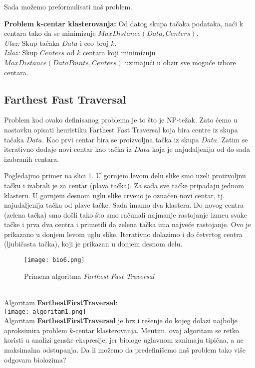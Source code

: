 Sada možemo preformulisati naš problem.

\begin{tcolorbox}
\textbf{Problem k-centar klasterovanja:} Od datog skupa tačaka podataka, naći k centara tako da se minimizuje $MaxDistance(Data, Centers)$.\\
\textit{Ulaz:} Skup tačaka $Data$ i ceo broj $k$.\\
\textit{Izlaz:} Skup $Centers$ od $k$ centara koji minimizuju $MaxDistance(DataPoints, Centers)$ uzimajući u obzir sve moguće izbore centara.
\end{tcolorbox}

\subsection{Farthest Fast Traversal}
Problem kod ovako definisanog problema je to što je NP-težak. Zato ćemo u nastavku opisati heuristiku Farthest Fast Traversal koja bira centre iz skupa tačaka $Data$.
Kao prvi centar bira se proizvoljna tačka iz skupa $Data$. Zatim se iterativno dodaje novi centar kao tačka iz $Data$ koja je najudaljenija od do sada izabranih centara.

Pogledajmo primer na slici \ref{slika 7}. U gornjem levom delu slike smo uzeli proizvoljnu tačku i izabrali je za centar (plava tačka). Za sada sve tačke pripadaju jednom klasteru. U gornjem desnom uglu slike crveno je označen novi centar, tj. najudaljenija tačka od plave tačke. Sada imamo dva klastera. Do novog centra (zelena tačka) smo došli tako što smo računali najmanje rastojanje izme\dj u svake tačke i prva dva centra i primetili da zelena tačka ima najveće rastojanje. Ovo je prikazano u donjem levom uglu slike. Iterativno dolazimo i do četvrtog centra (ljubičasta tačka), koji je prikazan u donjem desnom delu.
\begin{figure}[h]
    \centering
    \texttt{[image: bio6.png]}
    \caption{Primena algoritma \emph{Farthest Fast Traversal}}
    \label{slika 7}
\end{figure}
\\

Algoritam \textbf{FarthestFirstTraversal}:
\\
\texttt{[image: algoritam1.png]}
\\

Algoritam \textbf{FarthestFirstTraversal} je brz i rešenje do kojeg dolazi najbolje aproksimira problem $k$-centar klasterovanja. Me\dj utim, ovaj algoritam se retko koristi u analizi genske ekspresije, jer biologe uglavnom zanimaju tipična, a ne maksimalna odstupanja. Da li možemo da predefinišemo naš problem tako više odgovara biolozima?


